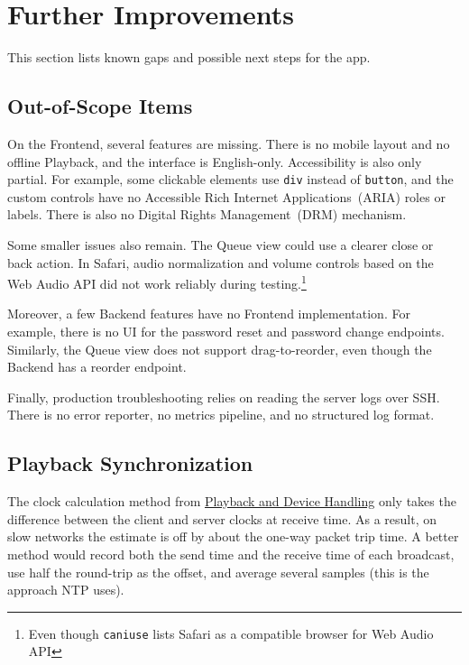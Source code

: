 \section{Further Improvements}\label{sec:improvements}
This section lists known gaps and possible next steps for the
app.

\subsection{Out-of-Scope Items}\label{subsec:imp_out_of_scope}
On the Frontend, several features are missing. There is no
mobile layout and no offline Playback, and the interface is
English-only. Accessibility is also only partial. For example,
some clickable elements use \texttt{div} instead of
\texttt{button}, and the custom controls have no Accessible Rich
Internet Applications~(ARIA) roles or labels. There is also no
Digital Rights Management~(DRM) mechanism.

Some smaller issues also remain. The Queue view could use a clearer
close or back action. In Safari, audio normalization and volume controls
based on the Web Audio API did not work reliably during
testing.\footnote{Even though \texttt{caniuse} lists Safari as a compatible
browser for Web Audio API\parencite{caniuse_webaudio}}\parencite{webkit_hls_webaudio,shaka_safari_webaudio}

Moreover, a few Backend features have no Frontend
implementation. For example, there is no UI for the password
reset and password change endpoints.
Similarly, the Queue view does not support drag-to-reorder,
even though the Backend has a reorder endpoint.

Finally, production troubleshooting relies on reading the
server logs over SSH\@. There is no error reporter, no metrics
pipeline, and no structured log format.

\subsection{Playback Synchronization}\label{subsec:imp_clock}
The clock calculation method from
\hyperref[sec:playback]{Playback and Device Handling} only takes
the difference between the client and server clocks at receive
time. As a result, on slow networks the estimate is off by about
the one-way packet trip time. A better method would record both
the send time and the receive time of each broadcast, use half
the round-trip as the offset, and average several samples (this
is the approach NTP uses).~\parencite{rfc5905_ntp}

